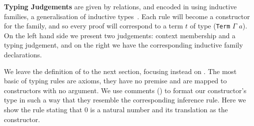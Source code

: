 \begin{centertight}
\begin{minipage}{0.35\textwidth}
\syntaxcontexts
\end{minipage}\hfill
\begin{minipage}{0.55\textwidth}
\end{minipage}
\end{centertight}


\textbf{Typing Judgements} are given by relations, and encoded in
\Idris{} using inductive families, a generalisation of inductive
types~\cite{DBLP:journals/fac/Dybjer94}.
%
Each rule will become a constructor for the family, and so every
proof \inferenceRule{} will correspond to a term $t$ of type
(\texttt{Term} $\Gamma$ $a$).
%
On the left hand side we present two judgements: context membership
and a typing judgement, and on the right we have the corresponding
inductive family declarations.

\begin{centertight}
\begin{minipage}{0.10\textwidth}
\varRule
\inferenceRule
\end{minipage}\hfill
\begin{minipage}{0.80\textwidth}
\end{minipage}
\end{centertight}

We leave the definition of  to the next section,
focusing instead on .
%
The most basic of typing rules are axioms, they have no premise
and are mapped to constructors with no argument.
We use \Idris{} comments (\IdrisComment{\KatlaDash{}\KatlaDash})
to format our constructor's type in such
a way that they resemble the corresponding inference rule.
%
Here we show the rule stating that $0$ is a natural number and
its translation as the  constructor.

\begin{centertight}
\begin{minipage}{0.45\textwidth}
\inferenceZero
\end{minipage}\hfill
\begin{minipage}{0.45\textwidth}
\end{minipage}
\end{centertight}

